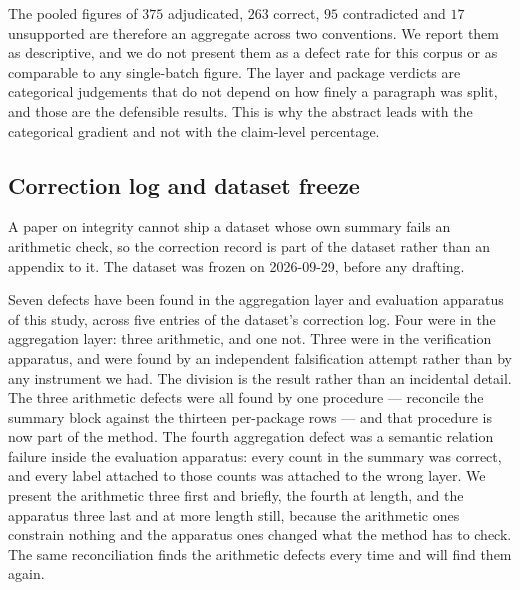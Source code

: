 \documentclass[sigconf,review]{acmart}
\begin{document}
The pooled figures of $375$ adjudicated, $263$ correct, $95$ contradicted and
$17$ unsupported are therefore an aggregate across two conventions. We report
them as descriptive, and we do not present them as a defect rate for this
corpus or as comparable to any single-batch figure. The layer and package
verdicts are categorical judgements that do not depend on how finely a
paragraph was split, and those are the defensible results. This is why the
abstract leads with the categorical gradient and not with the claim-level
percentage.

\subsection{Correction log and dataset freeze}
\label{sec:correction}

A paper on integrity cannot ship a dataset whose own summary fails an
arithmetic check, so the correction record is part of the dataset rather than
an appendix to it. The dataset was frozen on 2026-09-29, before any drafting.

Seven defects have been found in the aggregation layer and evaluation
apparatus of this study, across five entries of the dataset's correction log.
Four were in the aggregation layer: three arithmetic, and one not. Three were in
the verification apparatus, and were found by an independent falsification
attempt rather than by any instrument we had. The division is the result rather
than an incidental detail. The three arithmetic defects were all found by one
procedure --- reconcile the summary block against the thirteen per-package rows
--- and that procedure is now part of the method. The fourth aggregation defect
was a semantic relation failure inside the evaluation apparatus: every count in
the summary was correct, and every label attached to those counts was attached
to the wrong layer. We present the arithmetic three first and briefly, the
fourth at length, and the apparatus three last and at more length still,
because the arithmetic ones constrain nothing and the apparatus ones changed
what the method has to check. The same reconciliation finds the arithmetic
defects every time and will find them again.
\end{document}

